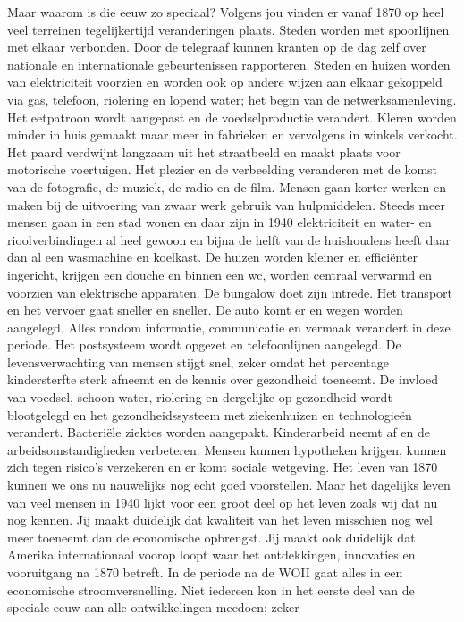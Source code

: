 \documentclass[]{book}
\begin{document}
Maar waarom is die eeuw zo speciaal? Volgens jou vinden er vanaf 1870 op
heel veel terreinen tegelijkertijd veranderingen plaats. Steden worden
met spoorlijnen met elkaar verbonden. Door de telegraaf kunnen kranten
op de dag zelf over nationale en internationale gebeurtenissen
rapporteren. Steden en huizen worden van elektriciteit voorzien en
worden ook op andere wijzen aan elkaar gekoppeld via gas, telefoon,
riolering en lopend water; het begin van de netwerksamenleving. Het
eetpatroon wordt aangepast en de voedselproductie verandert. Kleren
worden minder in huis gemaakt maar meer in fabrieken en vervolgens in
winkels verkocht. Het paard verdwijnt langzaam uit het straatbeeld en
maakt plaats voor motorische voertuigen. Het plezier en de verbeelding
veranderen met de komst van de fotografie, de muziek, de radio en de
film. Mensen gaan korter werken en maken bij de uitvoering van zwaar
werk gebruik van hulpmiddelen. Steeds meer mensen gaan in een stad wonen
en daar zijn in 1940 elektriciteit en water- en rioolverbindingen al
heel gewoon en bijna de helft van de huishoudens heeft daar dan al een
wasmachine en koelkast. De huizen worden kleiner en efficiënter
ingericht, krijgen een douche en binnen een wc, worden centraal verwarmd
en voorzien van elektrische apparaten. De bungalow doet zijn intrede.
Het transport en het vervoer gaat sneller en sneller. De auto komt er en
wegen worden aangelegd. Alles rondom informatie, communicatie en vermaak
verandert in deze periode. Het postsysteem wordt opgezet en
telefoonlijnen aangelegd. De levensverwachting van mensen stijgt snel,
zeker omdat het percentage kindersterfte sterk afneemt en de kennis over
gezondheid toeneemt. De invloed van voedsel, schoon water, riolering en
dergelijke op gezondheid wordt blootgelegd en het gezondheidssysteem met
ziekenhuizen en technologieën verandert. Bacteriële ziektes worden
aangepakt. Kinderarbeid neemt af en de arbeidsomstandigheden verbeteren.
Mensen kunnen hypotheken krijgen, kunnen zich tegen risico's verzekeren
en er komt sociale wetgeving. Het leven van 1870 kunnen we ons nu
nauwelijks nog echt goed voorstellen. Maar het dagelijks leven van veel
mensen in 1940 lijkt voor een groot deel op het leven zoals wij dat nu
nog kennen. Jij maakt duidelijk dat kwaliteit van het leven misschien
nog wel meer toeneemt dan de economische opbrengst. Jij maakt ook
duidelijk dat Amerika internationaal voorop loopt waar het ontdekkingen,
innovaties en vooruitgang na 1870 betreft. In de periode na de WOII gaat
alles in een economische stroomversnelling. Niet iedereen kon in het
eerste deel van de speciale eeuw aan alle ontwikkelingen meedoen; zeker
\end{document}
